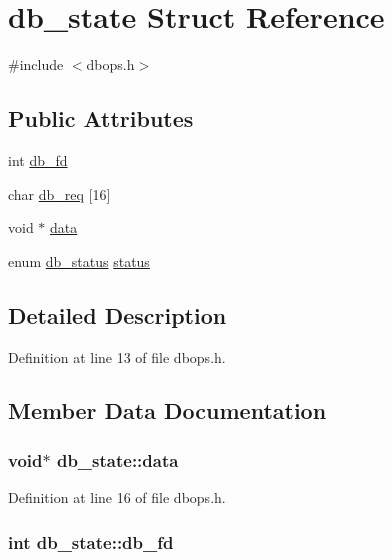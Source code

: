 \hypertarget{structdb__state}{\section{db\-\_\-state Struct Reference}
\label{structdb__state}
}


{\ttfamily \#include $<$dbops.\-h$>$}

\subsection*{Public Attributes}
\begin{DoxyCompactItemize}
\item 
int \hyperlink{structdb__state_a002ee75fd5b32dfdacf3850fe5e7096d}{db\-\_\-fd}
\item 
char \hyperlink{structdb__state_aaacfe4e1d9c23b3eeed0f6a96da1874d}{db\-\_\-req} \mbox{[}16\mbox{]}
\item 
void $\ast$ \hyperlink{structdb__state_a794093b06a3b4bde2e68fec74b447f8f}{data}
\item 
enum \hyperlink{dbops_8h_add81c081d239e1c0cdae4bf80dd6f235}{db\-\_\-status} \hyperlink{structdb__state_a55975b94a2a298c08156b77d1dae8973}{status}
\end{DoxyCompactItemize}


\subsection{Detailed Description}


Definition at line 13 of file dbops.\-h.



\subsection{Member Data Documentation}
\hypertarget{structdb__state_a794093b06a3b4bde2e68fec74b447f8f}{
\subsubsection[{data}]{\setlength{\rightskip}{0pt plus 5cm}void$\ast$ db\-\_\-state\-::data}}\label{structdb__state_a794093b06a3b4bde2e68fec74b447f8f}


Definition at line 16 of file dbops.\-h.

\hypertarget{structdb__state_a002ee75fd5b32dfdacf3850fe5e7096d}{
\subsubsection[{db\-\_\-fd}]{\setlength{\rightskip}{0pt plus 5cm}int db\-\_\-state\-::db\-\_\-fd}}\label{structdb__state_a002ee75fd5b32dfdacf3850fe5e7096d}



